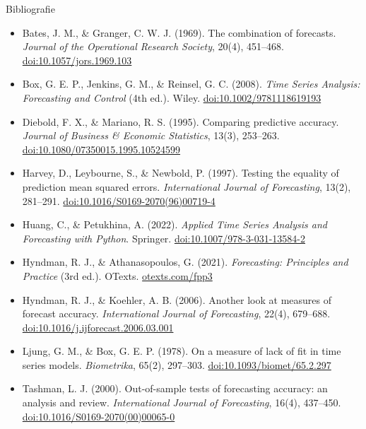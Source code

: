 \begin{frame}{Bibliografie}
\itemsize{\tiny}
\begin{itemize}
    \item Bates, J. M., \& Granger, C. W. J. (1969). The combination of forecasts. \textit{Journal of the Operational Research Society}, 20(4), 451--468. \href{https://doi.org/10.1057/jors.1969.103}{doi:10.1057/jors.1969.103}
    \item Box, G. E. P., Jenkins, G. M., \& Reinsel, G. C. (2008). \textit{Time Series Analysis: Forecasting and Control} (4th ed.). Wiley. \href{https://doi.org/10.1002/9781118619193}{doi:10.1002/9781118619193}
    \item Diebold, F. X., \& Mariano, R. S. (1995). Comparing predictive accuracy. \textit{Journal of Business \& Economic Statistics}, 13(3), 253--263. \href{https://doi.org/10.1080/07350015.1995.10524599}{doi:10.1080/07350015.1995.10524599}
    \item Harvey, D., Leybourne, S., \& Newbold, P. (1997). Testing the equality of prediction mean squared errors. \textit{International Journal of Forecasting}, 13(2), 281--291. \href{https://doi.org/10.1016/S0169-2070(96)00719-4}{doi:10.1016/S0169-2070(96)00719-4}
    \item Huang, C., \& Petukhina, A. (2022). \textit{Applied Time Series Analysis and Forecasting with Python}. Springer. \href{https://doi.org/10.1007/978-3-031-13584-2}{doi:10.1007/978-3-031-13584-2}
    \item Hyndman, R. J., \& Athanasopoulos, G. (2021). \textit{Forecasting: Principles and Practice} (3rd ed.). OTexts. \href{https://otexts.com/fpp3/}{otexts.com/fpp3}
    \item Hyndman, R. J., \& Koehler, A. B. (2006). Another look at measures of forecast accuracy. \textit{International Journal of Forecasting}, 22(4), 679--688. \href{https://doi.org/10.1016/j.ijforecast.2006.03.001}{doi:10.1016/j.ijforecast.2006.03.001}
    \item Ljung, G. M., \& Box, G. E. P. (1978). On a measure of lack of fit in time series models. \textit{Biometrika}, 65(2), 297--303. \href{https://doi.org/10.1093/biomet/65.2.297}{doi:10.1093/biomet/65.2.297}
    \item Tashman, L. J. (2000). Out-of-sample tests of forecasting accuracy: an analysis and review. \textit{International Journal of Forecasting}, 16(4), 437--450. \href{https://doi.org/10.1016/S0169-2070(00)00065-0}{doi:10.1016/S0169-2070(00)00065-0}
\end{itemize}
\end{frame}


